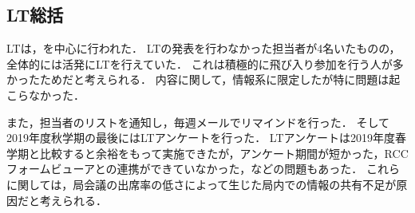 \subsection*{LT総括}

LTは，\firstGrade{}を中心に行われた．
LTの発表を行わなかった担当者が4名いたものの，全体的には活発にLTを行えていた．
これは積極的に飛び入り参加を行う人が多かったためだと考えられる．
内容に関して，情報系に限定したが特に問題は起こらなかった．

また，担当者のリストを通知し，毎週メールでリマインドを行った．
そして2019年度秋学期の最後にはLTアンケートを行った．
LTアンケートは2019年度春学期と比較すると余裕をもって実施できたが，アンケート期間が短かった，RCCフォームビューアとの連携ができていなかった，などの問題もあった．
これらに関しては，局会議の出席率の低さによって生じた局内での情報の共有不足が原因だと考えられる．
